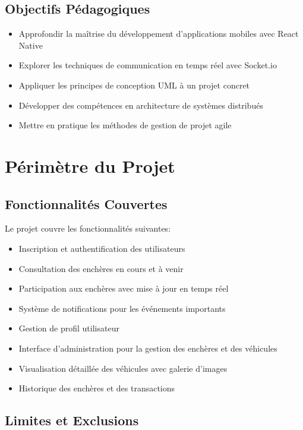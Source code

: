 \subsection{Objectifs Pédagogiques}

\begin{itemize}
    \item Approfondir la maîtrise du développement d'applications mobiles avec React Native
    \item Explorer les techniques de communication en temps réel avec Socket.io
    \item Appliquer les principes de conception UML à un projet concret
    \item Développer des compétences en architecture de systèmes distribués
    \item Mettre en pratique les méthodes de gestion de projet agile
\end{itemize}

\section{Périmètre du Projet}

\subsection{Fonctionnalités Couvertes}

Le projet couvre les fonctionnalités suivantes:

\begin{itemize}
    \item Inscription et authentification des utilisateurs
    \item Consultation des enchères en cours et à venir
    \item Participation aux enchères avec mise à jour en temps réel
    \item Système de notifications pour les événements importants
    \item Gestion de profil utilisateur
    \item Interface d'administration pour la gestion des enchères et des véhicules
    \item Visualisation détaillée des véhicules avec galerie d'images
    \item Historique des enchères et des transactions
\end{itemize}

\subsection{Limites et Exclusions}

